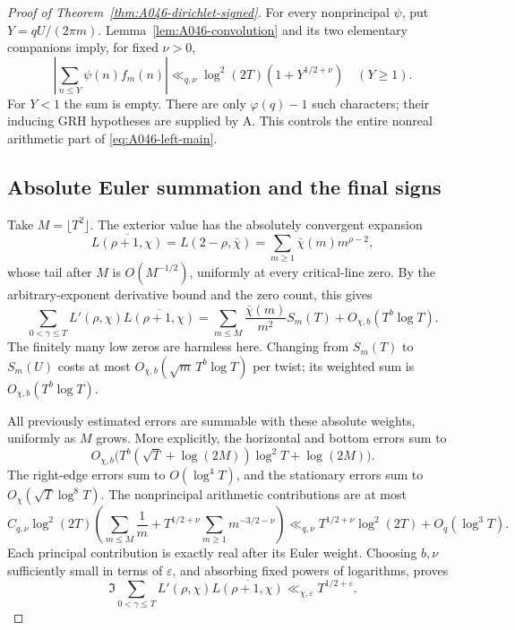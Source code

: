 \begin{proof}[Proof of Theorem~\ref{thm:A046-dirichlet-signed}]
For every nonprincipal \(\psi\), put \(Y=qU/(2\pi m)\).
Lemma~\ref{lem:A046-convolution} and its two elementary
companions imply, for fixed \(\nu>0\),
\[
   \left|\sum_{n\le Y}\psi(n)f_m(n)\right|
       \ll_{q,\nu}\log^2(2T)\left(1+Y^{1/2+\nu}\right)
                         \quad(Y\ge1).
\]
For \(Y<1\) the sum is empty. There are only
\(\varphi(q)-1\) such characters; their inducing GRH
hypotheses are supplied by A. This controls the entire
nonreal arithmetic part of \eqref{eq:A046-left-main}.

\subsection*{Absolute Euler summation and the final signs}

Take \(M=\lfloor T^2\rfloor\). The exterior value has the
absolutely convergent expansion
\[
 \overline{L(\rho+1,\chi)}
              =L(2-\rho,\bar\chi)
              =\sum_{m\ge1}\bar\chi(m)m^{\rho-2},
\]
whose tail after \(M\) is \(O(M^{-1/2})\), uniformly at
every critical-line zero. By the arbitrary-exponent
derivative bound and the zero count, this gives
\begin{equation}\label{eq:A046-euler-truncation}
 \sum_{0<\gamma\le T}L'(\rho,\chi)\overline{L(\rho+1,\chi)}
     =\sum_{m\le M}\frac{\bar\chi(m)}{m^2}S_m(T)
                          +O_{\chi,b}(T^b\log T).
\end{equation}
The finitely many low zeros are harmless here.
Changing from \(S_m(T)\) to \(S_m(U)\) costs at most
\(O_{\chi,b}(\sqrt m\,T^b\log T)\) per twist; its weighted
sum is \(O_{\chi,b}(T^b\log T)\).

All previously estimated errors are summable with these
absolute weights, uniformly as \(M\) grows. More explicitly,
the horizontal and bottom errors sum to
\[
 O_{\chi,b}\bigl(T^b(\sqrt T+\log(2M))\log^2T+\log(2M)\bigr).
\]
The right-edge errors sum to \(O(\log^4T)\), and the
stationary errors sum to \(O_\chi(\sqrt T\log^8T)\).
The nonprincipal arithmetic contributions are at most
\[
 C_{q,\nu}\log^2(2T)
    \left(\sum_{m\le M}\frac1m
          +T^{1/2+\nu}\sum_{m\ge1}m^{-3/2-\nu}\right)
       \ll_{q,\nu}T^{1/2+\nu}\log^2(2T)+O_q(\log^3T).
\]
Each principal contribution is exactly real after its
Euler weight. Choosing \(b,\nu\) sufficiently small in
terms of \(\varepsilon\), and absorbing fixed powers of
logarithms, proves
\begin{equation}\label{eq:A046-imaginary-mean}
 \Im\sum_{0<\gamma\le T}
       L'(\rho,\chi)\overline{L(\rho+1,\chi)}
                        \ll_{\chi,\varepsilon}T^{1/2+\varepsilon}.
\end{equation}


\end{proof}
